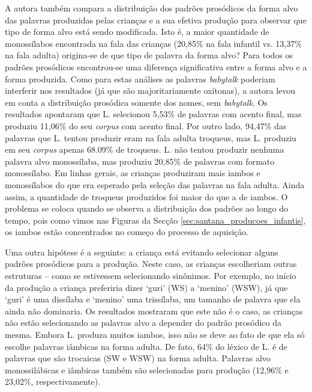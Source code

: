 \documentclass[output=paper]{LSP/langsci}
\begin{document}
A autora também compara a distribuição dos padrões prosódicos da forma alvo das palavras produzidas pelas crianças e a sua efetiva produção para observar que tipo de forma alvo está sendo modificada. Isto é, a maior quantidade de monossílabos encontrada na fala das crianças (20,85\% na fala infantil vs. 13,37\% na fala adulta) origina-se de que tipo de palavra da forma alvo? Para todos os padrões prosódicos encontrou-se uma diferença significativa entre a forma alvo e a forma produzida. Como para estas análises as palavras \textit{babytalk} poderiam interferir nos resultados (já que são majoritariamente oxítonas), a autora levou em conta a distribuição prosódica somente dos nomes, sem \textit{babytalk}. Os resultados apontaram que L. selecionou 5,53\% de palavras com acento final, mas produziu 11,06\% do seu \textit{corpus} com acento final. Por outro lado, 94,47\% das palavras que L. tentou produzir eram na fala adulta troqueus, mas L. produziu em seu \textit{corpus} apenas 68.09\% de troqueus. L. não tentou produzir nenhuma palavra alvo monossílaba, mas produziu 20,85\% de palavras com formato monossílabo. Em linhas gerais, as crianças produziram mais iambos e monossílabos do que era esperado pela seleção das palavras na fala adulta. Ainda assim, a quantidade de troqueus produzidos foi maior do que a de iambos. O problema se coloca quando se observa a distribuição dos padrões ao longo do tempo, pois como vimos nas Figuras da Secção \ref{sec:santana_producoes_infantis}, os iambos estão concentrados no começo do processo de aquisição.

Uma outra hipótese é a seguinte: a criança está evitando selecionar alguns padrões prosódicos para a produção. Neste caso, as crianças escolheriam outras estruturas – como se estivessem selecionando sinônimos. Por exemplo, no início da produção a criança preferiria dizer `guri' (WS) a `menino' (WSW), já que `guri' é uma dissílaba e `menino' uma trissílaba, um tamanho de palavra que ela ainda não dominaria. Os resultados mostraram que este não é o caso, as crianças não estão selecionando as palavras alvo a depender do padrão prosódico da mesma. Embora L. produza muitos iambos, isso não se deve ao fato de que ela só escolhe palavras iâmbicas na forma adulta. De fato, 64\% do léxico de L. é de palavras que são trocaicas (SW e WSW) na forma adulta. Palavras alvo monossilábicas e iâmbicas também são selecionadas para produção (12,96\% e 23,02\%, respectivamente).
\end{document}

